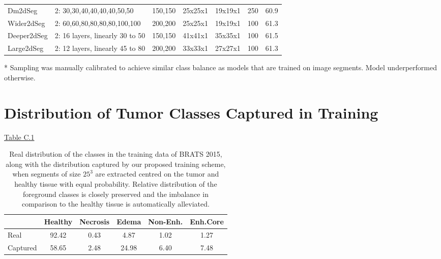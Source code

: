 \documentclass[preprint,authoryear,12pt]{elsarticle}
\begin{document}
\begin{table}[!h]
\begin{subtable}{1.0\linewidth}
\begin{threeparttable}
\begin{tabular}{@{}m{1.5cm}m{3.7cm}m{1.2cm}m{1.2cm}m{1.2cm}m{0.8cm}m{1.3cm}}
Dm2dSeg        & 2: 30,30,40,40,40,40,50,50      & 150,150    & 25x25x1    & 19x19x1    &250 & 60.9       \\
Wider2dSeg     & 2: 60,60,80,80,80,80,100,100    & 200,200    & 25x25x1    & 19x19x1    &100 & 61.3       \\
Deeper2dSeg    & 2: 16 layers, linearly 30 to 50 & 150,150    & 41x41x1    & 35x35x1    &100 & 61.5       \\
Large2dSeg  	& 2: 12 layers, linearly 45 to 80 & 200,200    & 33x33x1    & 27x27x1    &100 & 61.3    \\ \bottomrule
\end{tabular}
\begin{tablenotes}
            \item[*] Sampling was manually calibrated to achieve similar class balance as models that are trained on image segments. Model underperformed otherwise.
\end{tablenotes}
\end{threeparttable}
\end{subtable}
\end{table}

\section{Distribution of Tumor Classes Captured in Training}
\label{app:distrTumorClassesTrain}
\setcounter{table}{0}    
\renewcommand\thetable{C.\arabic{table}} 

\hyperref[table:trainingSamplesPercBrats2015Training]{Table C.1}

\begin{table}[!h]
\centering
\scriptsize
\caption{Real distribution of the classes in the training data of BRATS 2015, along with the distribution captured by our proposed training scheme, when segments of size $25^3$ are extracted centred on the tumor and healthy tissue with equal probability. Relative distribution of the foreground classes is closely preserved and the imbalance in comparison to the healthy tissue is automatically alleviated.}
\label{table:trainingSamplesPercBrats2015Training}
\begin{tabular}{@{}lccccc@{}}
\toprule
\multicolumn{1}{c}{} & Healthy		& Necrosis 	& Edema 		& Non-Enh. 	& Enh.Core 	\\ \midrule
Real		 			& 92.42			& 0.43		& 4.87		& 1.02		& 1.27		\\
Captured				& 58.65			& 2.48		& 24.98		& 6.40		& 7.48		\\
\bottomrule
\end{tabular}
\end{table}

 


\end{document}
